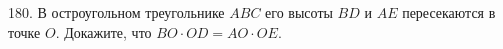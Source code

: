 180. В остроугольном треугольнике $ABC$ его высоты $BD$ и $AE$ пересекаются в точке $O.$ Докажите, что $BO\cdot OD=AO\cdot OE.$\\
